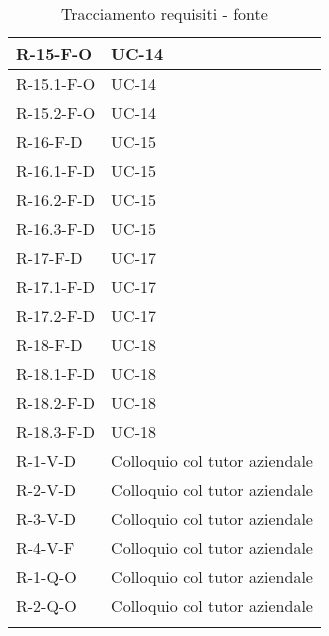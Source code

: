\begin{center}
\begin{longtable}{| C{6cm} |C{6cm}|}
        R-15-F-O & UC-14\\\hline
        R-15.1-F-O & UC-14\\\hline
        R-15.2-F-O & UC-14\\\hline
        R-16-F-D & UC-15 \\\hline
        R-16.1-F-D & UC-15 \\\hline
        R-16.2-F-D & UC-15 \\\hline
        R-16.3-F-D & UC-15 \\\hline
        R-17-F-D & UC-17 \\\hline
        R-17.1-F-D & UC-17 \\\hline
        R-17.2-F-D & UC-17 \\\hline
        R-18-F-D & UC-18 \\\hline
        R-18.1-F-D & UC-18 \\\hline
        R-18.2-F-D & UC-18 \\\hline
        R-18.3-F-D & UC-18 \\\hline
        R-1-V-D& Colloquio col tutor aziendale\\\hline
        R-2-V-D& Colloquio col tutor aziendale\\\hline
        R-3-V-D& Colloquio col tutor aziendale\\\hline
        R-4-V-F& Colloquio col tutor aziendale\\\hline
        R-1-Q-O& Colloquio col tutor aziendale\\\hline
        R-2-Q-O& Colloquio col tutor aziendale\\\hline
        \caption{Tracciamento requisiti - fonte}
    \end{longtable}
\end{center}